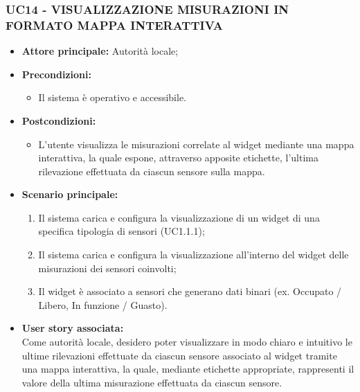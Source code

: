 \subsubsection{UC14 - VISUALIZZAZIONE MISURAZIONI IN FORMATO MAPPA INTERATTIVA}
\begin{itemize}
    \item \textbf{Attore principale:} Autorità locale;
    \item \textbf{Precondizioni:}
        \begin{itemize}
            \item Il sistema è operativo e accessibile.
        \end{itemize}
    \item \textbf{Postcondizioni:}
        \begin{itemize}
            \item L'utente visualizza le misurazioni correlate al widget mediante una mappa interattiva, la quale espone, attraverso apposite etichette, l'ultima rilevazione effettuata da ciascun sensore sulla mappa.
        \end{itemize}
    \item \textbf{Scenario principale:}
        \begin{enumerate}
            \item Il sistema carica e configura la visualizzazione di un widget di una specifica tipologia di sensori (UC1.1.1);
                \item Il sistema carica e configura la visualizzazione all'interno del widget delle misurazioni dei sensori coinvolti;
                \item Il widget è associato a sensori che generano dati binari (ex. Occupato / Libero, In funzione / Guasto).
        \end{enumerate}
    \item \textbf{User story associata:} \\
        Come autorità locale, desidero poter visualizzare in modo chiaro e intuitivo le ultime rilevazioni effettuate da ciascun sensore associato al widget tramite una mappa interattiva, la quale, mediante etichette appropriate, rappresenti il valore della ultima misurazione effettuata da ciascun sensore.
\end{itemize}